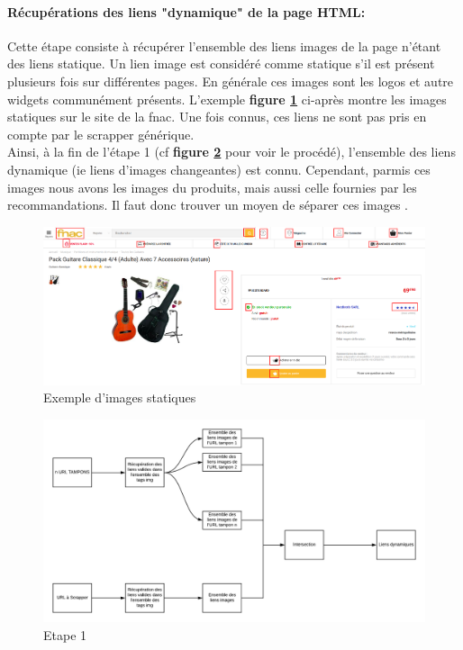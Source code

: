 \documentclass{article} %
\begin{document}
\paragraph{Récupérations des liens "dynamique" de la page HTML:\\}
Cette étape consiste à récupérer l'ensemble des liens images de la page n'étant des liens statique. Un lien image est considéré comme statique s'il est présent plusieurs fois sur différentes pages. En générale ces images sont les logos et autre widgets communément présents. L'exemple \textbf{figure \ref{fig:stats}} ci-après montre les images statiques sur le site de la fnac. Une fois connus, ces liens ne sont pas pris en compte par le scrapper générique.\\ 
Ainsi, à la fin de l'étape 1 (cf \textbf{figure \ref{fig:step1}} pour voir le procédé), l'ensemble des liens dynamique (ie liens d'images changeantes) est connu. Cependant, parmis ces images nous avons les images du produits, mais aussi celle fournies par les recommandations. Il faut donc trouver un moyen de séparer ces images .

\begin{figure}[!h]
	\centering
	\includegraphics[keepaspectratio = true,scale=0.25]{static.png}
	\caption{Exemple d'images statiques}
	\label{fig:stats}
\end{figure}

 
\begin{figure}[!h]
	\centering
	\includegraphics[keepaspectratio = true,scale=0.4]{step1.png}
	\caption{Etape 1}
	\label{fig:step1}
\end{figure}
\end{document}

